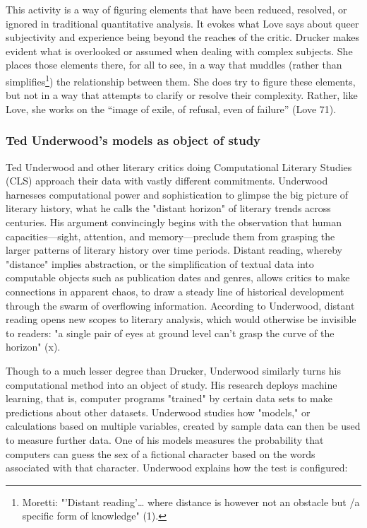 \documentclass[11pt]{article}
\begin{document}
This activity is a way of figuring elements that have been reduced,
resolved, or ignored in traditional quantitative analysis. It evokes
what Love says about queer subjectivity and experience being beyond
the reaches of the critic. Drucker makes evident what is overlooked or
assumed when dealing with complex subjects. She places those elements
there, for all to see, in a way that muddles (rather than
simplifies\footnote{Moretti: "'Distant reading'\ldots{} where distance is however not an
obstacle but /a specific form of knowledge" (1).}) the relationship between them. She does try to
figure these elements, but not in a way that attempts to clarify or
resolve their complexity. Rather, like Love, she works on the “image
of exile, of refusal, even of failure” (Love 71).

\subsubsection{Ted Underwood's models as object of study}
\label{sec:org3e97dd0}

Ted Underwood and other literary critics doing Computational Literary
Studies (CLS) approach their data with vastly different
commitments. Underwood harnesses computational power and
sophistication to glimpse the big picture of literary history, what he
calls the "distant horizon" of literary trends across centuries. His
argument convincingly begins with the observation that human
capacities---sight, attention, and memory---preclude them from
grasping the larger patterns of literary history over time
periods. Distant reading, whereby "distance" implies abstraction, or
the simplification of textual data into computable objects such as
publication dates and genres, allows critics to make connections in
apparent chaos, to draw a steady line of historical development
through the swarm of overflowing information. According to Underwood,
distant reading opens new scopes to literary analysis, which would
otherwise be invisible to readers: "a single pair of eyes at ground
level can't grasp the curve of the horizon" (x).

Though to a much lesser degree than Drucker, Underwood similarly turns
his computational method into an object of study. His research deploys
machine learning, that is, computer programs "trained" by certain data
sets to make predictions about other datasets. Underwood studies how
"models," or calculations based on multiple variables, created by
sample data can then be used to measure further data. One of his
models measures the probability that computers can guess the sex of
a fictional character based on the words associated with that
character. Underwood explains how the test is configured:
\end{document}
